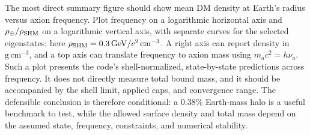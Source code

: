 \documentclass[11pt]{article}
\begin{document}
The most direct summary figure should show mean DM density at Earth's radius versus axion frequency. Plot frequency on a logarithmic horizontal axis and $\rho_\oplus/\rho_{\rm SHM}$ on a logarithmic vertical axis, with separate curves for the selected eigenstates; here $\rho_{\rm SHM}=0.3\,\mathrm{GeV}/c^2\,\mathrm{cm}^{-3}$. A right axis can report density in $\mathrm{g\,cm^{-3}}$, and a top axis can translate frequency to axion mass using $m_ac^2=h\nu_a$. Such a plot presents the code's shell-normalized, state-by-state predictions across frequency. It does not directly measure total bound mass, and it should be accompanied by the shell limit, applied caps, and convergence range. The defensible conclusion is therefore conditional: a $0.38\%$ Earth-mass halo is a useful benchmark to test, while the allowed surface density and total mass depend on the assumed state, frequency, constraints, and numerical stability.
\end{document}
